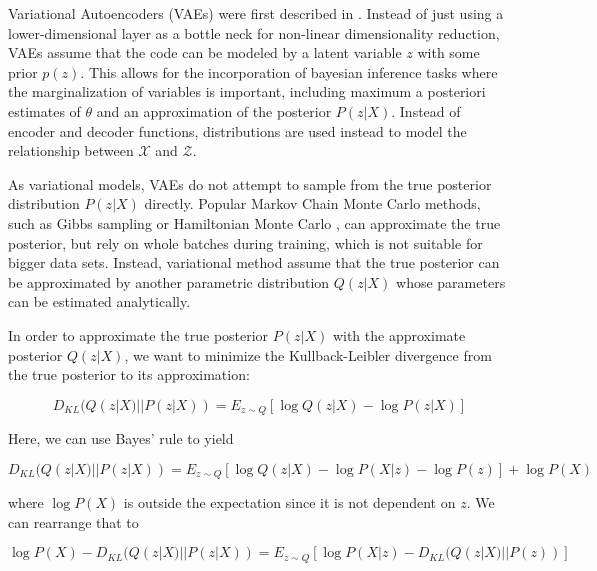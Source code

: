 \documentclass[6pt]{article}
\begin{document}
Variational Autoencoders (VAEs) were first described in \cite{kingma2013auto}. Instead of just using a lower-dimensional layer as a bottle neck for non-linear dimensionality reduction, VAEs assume that the code can be modeled by a latent variable $z$ with some prior $p(z)$. This allows for the incorporation of bayesian inference tasks where the marginalization of variables is important, including maximum a posteriori estimates of $\theta$ and an approximation of the posterior $P(z|X)$. Instead of encoder and decoder functions, distributions are used instead to model the relationship between $\mathcal{X} $ and $  \mathcal{Z}$.

As variational models, VAEs do not attempt to sample from the true posterior distribution $P(z|X)$ directly. Popular Markov Chain Monte Carlo methods, such as Gibbs sampling \citep{geman1984stochastic} or Hamiltonian Monte Carlo \citep{duane1987hybrid}, can approximate the true posterior, but rely on whole batches during training, which is not suitable for bigger data sets. Instead, variational method assume that the true posterior can be approximated by another parametric distribution $Q(z|X)$ whose parameters can be estimated analytically. 

In order to approximate the true posterior  $P(z|X)$ with the approximate posterior $Q(z|X)$, we want to minimize the Kullback-Leibler divergence from the true posterior to its approximation: 

\begin{equation}
D_{KL}(Q(z|X)||P(z|X)) = E_{z\sim Q}[\log Q(z|X) - \log P(z|X)]
\end{equation}

Here, we can use Bayes' rule to yield 

\begin{equation}
D_{KL}(Q(z|X)||P(z|X)) = E_{z\sim Q}[\log Q(z|X) - \log P(X|z)-\log P(z)] + \log P(X)
\end{equation}

where $\log P(X)$ is outside the expectation since it is not dependent on $z$. We can rearrange that to 

\begin{equation}
\label{eq:vae_loss_original}
\log P(X) - D_{KL}(Q(z|X)||P(z|X)) = E_{z\sim Q}[\log P(X|z) - D_{KL}(Q(z|X)||P(z))] 
\end{equation}
\end{document}
